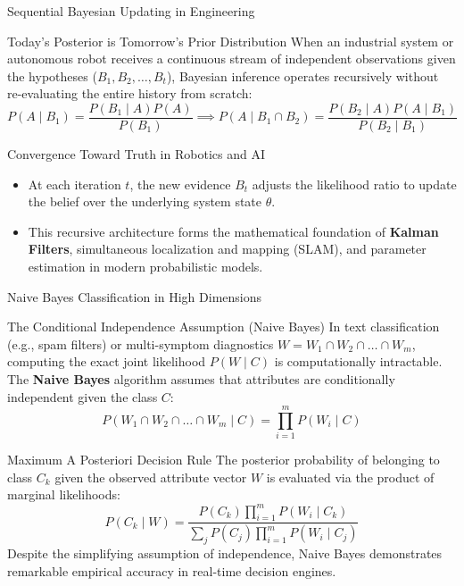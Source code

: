 \documentclass[10pt, aspectratio=169]{beamer}
\begin{document}
\begin{frame}{Sequential Bayesian Updating in Engineering}
  \fontsize{7.5pt}{9pt}\selectfont
  \begin{block}{Today's Posterior is Tomorrow's Prior Distribution}
    \fontsize{7.5pt}{9pt}\selectfont
    When an industrial system or autonomous robot receives a continuous stream of independent observations given the hypotheses ($B_1, B_2, \ldots, B_t$), Bayesian inference operates recursively without re-evaluating the entire history from scratch:
    $$P(A \mid B_1) = \frac{P(B_1 \mid A)P(A)}{P(B_1)} \implies P(A \mid B_1 \cap B_2) = \frac{P(B_2 \mid A)P(A \mid B_1)}{P(B_2 \mid B_1)}$$
  \end{block}
  \vspace{-0.15cm}
  \pause
  \begin{alertblock}{Convergence Toward Truth in Robotics and AI}
    \fontsize{7.5pt}{9pt}\selectfont
    \begin{itemize}\itemsep=0.08cm
      \item At each iteration $t$, the new evidence $B_t$ adjusts the likelihood ratio to update the belief over the underlying system state $\theta$.
      \item This recursive architecture forms the mathematical foundation of \textbf{Kalman Filters}, simultaneous localization and mapping (SLAM), and parameter estimation in modern probabilistic models.
    \end{itemize}
  \end{alertblock}
\end{frame}

\begin{frame}{Naive Bayes Classification in High Dimensions}
  \fontsize{7.5pt}{9pt}\selectfont
  \begin{block}{The Conditional Independence Assumption (Naive Bayes)}
    \fontsize{7.5pt}{9pt}\selectfont
    In text classification (e.g., spam filters) or multi-symptom diagnostics $W = W_1 \cap W_2 \cap \ldots \cap W_m$, computing the exact joint likelihood $P(W \mid C)$ is computationally intractable. The \textbf{Naive Bayes} algorithm assumes that attributes are conditionally independent given the class $C$:
    $$P(W_1 \cap W_2 \cap \ldots \cap W_m \mid C) = \prod_{i=1}^m P(W_i \mid C)$$
  \end{block}
  \vspace{-0.15cm}
  \pause
  \begin{alertblock}{Maximum A Posteriori Decision Rule}
    \fontsize{7.5pt}{9pt}\selectfont
    The posterior probability of belonging to class $C_k$ given the observed attribute vector $W$ is evaluated via the product of marginal likelihoods:
    $$P(C_k \mid W) = \frac{P(C_k) \prod_{i=1}^m P(W_i \mid C_k)}{\sum_{j} P(C_j) \prod_{i=1}^m P(W_i \mid C_j)}$$
    Despite the simplifying assumption of independence, Naive Bayes demonstrates remarkable empirical accuracy in real-time decision engines.
  \end{alertblock}
\end{frame}
\end{document}

